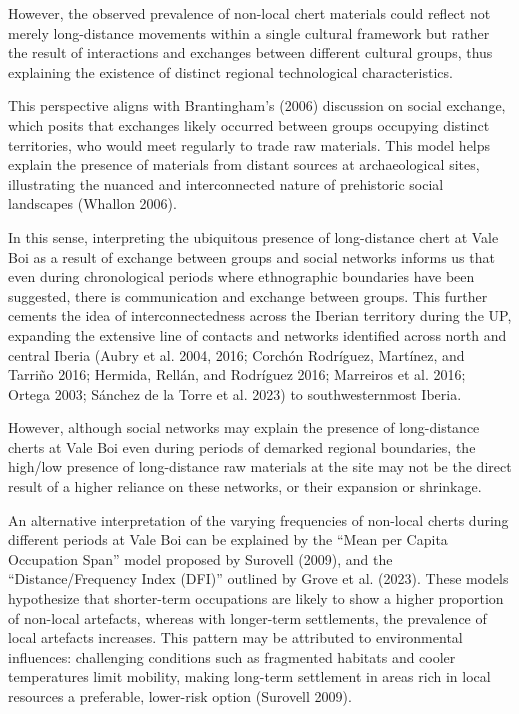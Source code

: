 \documentclass[
  a4paper,
  DIV=11,
  numbers=noendperiod]{scrreprt}
\begin{document}
However, the observed prevalence of non-local chert materials could
reflect not merely long-distance movements within a single cultural
framework but rather the result of interactions and exchanges between
different cultural groups, thus explaining the existence of distinct
regional technological characteristics.

This perspective aligns with Brantingham's (2006) discussion on social
exchange, which posits that exchanges likely occurred between groups
occupying distinct territories, who would meet regularly to trade raw
materials. This model helps explain the presence of materials from
distant sources at archaeological sites, illustrating the nuanced and
interconnected nature of prehistoric social landscapes (Whallon 2006).

In this sense, interpreting the ubiquitous presence of long-distance
chert at Vale Boi as a result of exchange between groups and social
networks informs us that even during chronological periods where
ethnographic boundaries have been suggested, there is communication and
exchange between groups. This further cements the idea of
interconnectedness across the Iberian territory during the UP, expanding
the extensive line of contacts and networks identified across north and
central Iberia (Aubry et al. 2004, 2016; Corchón Rodríguez, Martínez,
and Tarriño 2016; Hermida, Rellán, and Rodríguez 2016; Marreiros et al.
2016; Ortega 2003; Sánchez de la Torre et al. 2023) to southwesternmost
Iberia.

However, although social networks may explain the presence of
long-distance cherts at Vale Boi even during periods of demarked
regional boundaries, the high/low presence of long-distance raw
materials at the site may not be the direct result of a higher reliance
on these networks, or their expansion or shrinkage.

An alternative interpretation of the varying frequencies of non-local
cherts during different periods at Vale Boi can be explained by the
``Mean per Capita Occupation Span'' model proposed by Surovell (2009),
and the ``Distance/Frequency Index (DFI)'' outlined by Grove et al.
(2023). These models hypothesize that shorter-term occupations are
likely to show a higher proportion of non-local artefacts, whereas with
longer-term settlements, the prevalence of local artefacts increases.
This pattern may be attributed to environmental influences: challenging
conditions such as fragmented habitats and cooler temperatures limit
mobility, making long-term settlement in areas rich in local resources a
preferable, lower-risk option (Surovell 2009).
\end{document}
